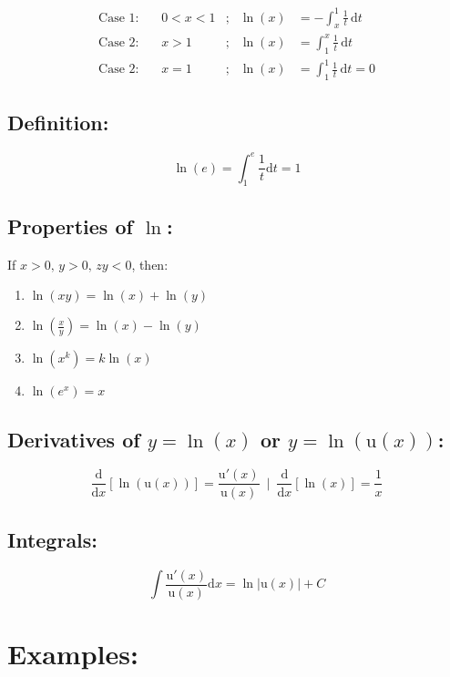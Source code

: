 \documentclass{article}
\newcommand{\ddx}{\frac{\mathrm{d}}{\mathrm{d}x}}
\begin{document}
\begin{align*}
    \text{Case 1}:& \, &0 < x < 1 &; &\ln(x) &= -\int_{x}^{1} \frac{1}{t}\,\mathrm{d}t \\
    \text{Case 2}:& \, &x > 1 &; &\ln(x) &= \int_{1}^{x} \frac{1}{t}\,\mathrm{d}t \\
    \text{Case 2}:& \, &x = 1 &; &\ln(x) &= \int_{1}^{1} \frac{1}{t}\,\mathrm{d}t = 0
\end{align*}

\subsection{Definition:} 
\[\ln(e) = \int_{1}^{e} \frac{1}{t} \mathrm{d}t=1\]

\subsection{Properties of $\ln$:}
If $x>0,\, y>0,\, zy<0$, then:
\begin{enumerate}
    \item $\ln(xy) = \ln(x)+\ln(y)$
    \item $\ln(\frac{x}{y}) = \ln(x)-\ln(y)$
    \item $\ln(x^k) = k\ln(x)$
    \item $\ln(e^x) = x$
\end{enumerate}

\subsection{Derivatives of $y=\ln(x)$ or $y=\ln(\mathrm{u}(x))$:}
\[\ddx[\ln(\mathrm{u}(x))]=\frac{\mathrm{u'}(x)}{\mathrm{u}(x)}\,\,\,\biggr\rvert\,\,\,\ddx[\ln(x)]=\frac{1}{x}\]

\subsection{Integrals:}
\[\int\frac{\mathrm{u'}(x)}{\mathrm{u}(x)}\mathrm{d}x = \ln\left\lvert\mathrm{u}(x)\right\rvert+C\]

\newpage
\section{Examples:}
\end{document}

